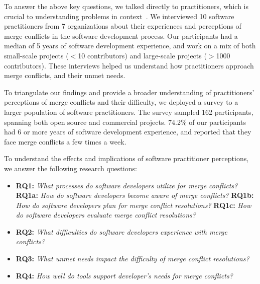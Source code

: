 To answer the above key questions, we talked directly to practitioners, which is crucial to understanding problems in context~\cite{fritz2010using, sillito2006questions, de2008answering, ko2007information}.
We interviewed 10 software practitioners from 7 organizations about their experiences and perceptions of merge conflicts in the software development process.
Our participants had a median of 5 years of software development experience, and work on a mix of both small-scale projects ($<$10 contributors) and large-scale projects ($>$1000 contributors).
These interviews helped us understand how practitioners approach merge conflicts, and their unmet needs.

To triangulate our findings and provide a broader understanding of practitioners' perceptions of merge conflicts and their difficulty, we deployed a survey to a larger population of software practitioners.
The survey sampled 162 participants, spanning both open source and commercial projects. 74.2\% of our participants had 6 or more years of software development experience, and reported that they face merge conflicts a few times a week.

To understand the effects and implications of software practitioner perceptions, we answer the following research questions:

\begin{itemize}
\item \textbf{RQ1:} \textit{What processes do software developers utilize for merge conflicts?}
\subitem \textbf{RQ1a:} \textit{How do software developers become aware of merge conflicts?}
\subitem \textbf{RQ1b:} \textit{How do software developers plan for merge conflict resolutions?}
\subitem \textbf{RQ1c:} \textit{How do software developers evaluate merge conflict resolutions?}
\item \textbf{RQ2:} \textit{What difficulties do software developers experience with merge conflicts?}
\item \textbf{RQ3:} \textit{What unmet needs impact the difficulty of merge conflict resolutions?}
\item \textbf{RQ4:} \textit{How well do tools support developer's needs for merge conflicts?}
\end{itemize}

